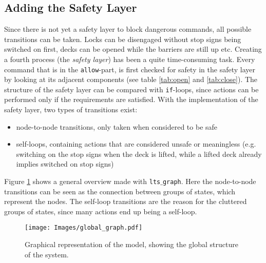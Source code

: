 \subsection{Adding the Safety Layer}
\label{sec:safety}
Since there is not yet a safety layer to block dangerous commands, all possible transitions can be taken. Locks can be disengaged without stop signs being switched on first, decks can be opened while the barriers are still up etc. Creating a fourth process (the \emph{safety layer}) has been a quite time-consuming task. Every command that is in the \texttt{allow}-part, is first checked for safety in the safety layer by looking at its adjacent components (see table \ref{tab:open} and \ref{tab:close}). The structure of the safety layer can be compared with \texttt{if}-loops, since actions can be performed only if the requirements are satisfied. With the implementation of the safety layer, two types of transitions exist:
%
\begin{itemize}
	\item node-to-node transitions, only taken when considered to be safe
	\item self-loops, containing actions that are considered unsafe or meaningless (e.g. switching on the stop signs when the deck is lifted, while a lifted deck already implies switched on stop signs)
\end{itemize}
%
Figure \ref{fig:global} shows a general overview made with \texttt{lts$\_$graph}. Here the node-to-node transitions can be seen as the connection between groups of states, which represent the nodes. The self-loop transitions are the reason for the cluttered groups of states, since many actions end up being a self-loop.
%
\begin{figure}[htb]
\centering
\texttt{[image: Images/global\_graph.pdf]}
\caption{Graphical representation of the model, showing the global structure of the system.}%
\label{fig:global}
\end{figure}%
%
